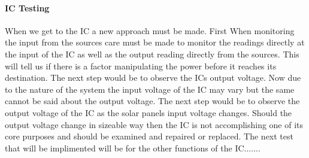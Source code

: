 \paragraph{IC Testing}
When we get to the IC a new approach must be made. First When monitoring the input from the sources care must be made to monitor the readings directly at the input of the IC as well as the output reading directly from the sources. This will tell us if there is a factor manipulating the power before it reaches its destination. The next step would be to observe the ICs output voltage. Now due to the nature of the system the input voltage of the IC may vary but the same cannot be said about the output voltage. The next step would be to observe the output voltage of the IC as the solar panels input voltage changes. Should the output voltage change in sizeable way then the IC is not accomplishing one of its core purposes and should be examined and repaired or replaced. The next test that will be implimented will be for the other functions of the IC.......
